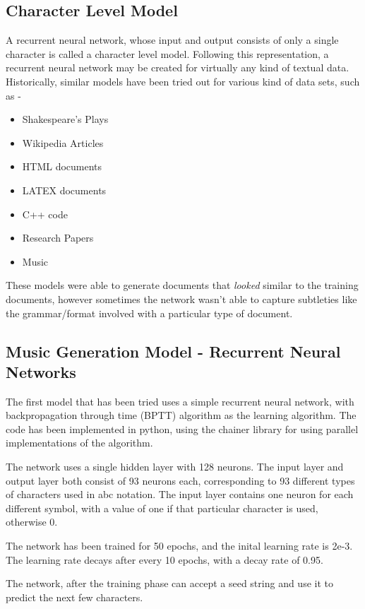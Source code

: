 \documentclass[11pt]{article}
\begin{document}
\subsection{Character Level Model}
A recurrent neural network, whose input and output consists of only a single character is called a character level model. Following this representation, a recurrent neural network may be created for virtually any kind of textual data. Historically, similar models have been tried out for various kind of data sets, such as -
\begin{itemize}
\item Shakespeare's Plays
\item Wikipedia Articles
\item HTML documents
\item LATEX documents
\item C++ code
\item Research Papers
\item Music
\end{itemize}

These models were able to generate documents that \emph{looked} similar to the training documents, however sometimes the network wasn't able to capture subtleties like the grammar/format involved with a particular type of document.

\subsection{Music Generation Model - Recurrent Neural Networks}
The first model that has been tried uses a simple recurrent neural network, with backpropagation through time (BPTT) algorithm as the learning algorithm. The code has been implemented in python, using the chainer library for using parallel implementations of the algorithm.

The network uses a single hidden layer with 128 neurons. The input layer and output layer both consist of 93 neurons each, corresponding to 93 different types of characters used in abc notation. The input layer contains one neuron for each different symbol, with a value of one if that particular character is used, otherwise 0. 

The network has been trained for 50 epochs, and the inital learning rate is 2e-3. The learning rate decays after every 10 epochs, with a decay rate of 0.95.

The network, after the training phase can accept a seed string and use it to predict the next few characters.
\end{document}
